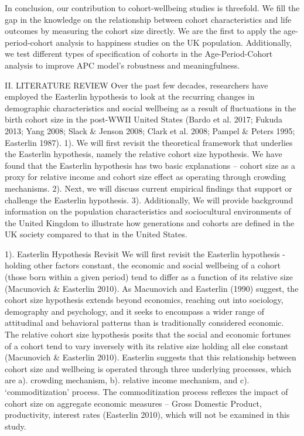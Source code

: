 In conclusion, our contribution to cohort-wellbeing studies is threefold. We fill the gap in the knowledge on the relationship between cohort characteristics and life outcomes by measuring the cohort size directly. We are the first to apply the age-period-cohort analysis to happiness studies on the UK population. Additionally, we test different types of specification of cohorts in the Age-Period-Cohort analysis to improve APC model’s robustness and meaningfulness.

II. LITERATURE REVIEW
Over the past few decades, researchers have employed the Easterlin hypothesis to look at the recurring changes in demographic characteristics and social wellbeing as a result of fluctuations in the birth cohort size in the post-WWII United States (Bardo et al. 2017; Fukuda 2013; Yang 2008; Slack & Jenson 2008; Clark et al. 2008; Pampel & Peters 1995; Easterlin 1987). 1). We will first revisit the theoretical framework that underlies the Easterlin hypothesis, namely the relative cohort size hypothesis. We have found that the Easterlin hypothesis has two basic explanations – cohort size as a proxy for relative income and cohort size effect as operating through crowding mechanisms. 2). Next, we will discuss current empirical findings that support or challenge the Easterlin hypothesis. 3). Additionally, We will provide background information on the population characteristics and sociocultural environments of the United Kingdom to illustrate how generations and cohorts are defined in the UK society compared to that in the United States.

1). Easterlin Hypothesis Revisit
We will first revisit the Easterlin hypothesis - holding other factors constant, the economic and social wellbeing of a cohort (those born within a given period) tend to differ as a function of its relative size (Macunovich & Easterlin 2010). As Macunovich and Easterlin (1990) suggest, the cohort size hypothesis extends beyond economics, reaching out into sociology, demography and psychology, and it seeks to encompass a wider range of attitudinal and behavioral patterns than is traditionally considered economic. The relative cohort size hypothesis posits that the social and economic fortunes of a cohort tend to vary inversely with its relative size holding all else constant (Macunovich & Easterlin 2010). Easterlin suggests that this relationship between cohort size and wellbeing is operated through three underlying processes, which are a). crowding mechanism, b). relative income mechanism, and c). ‘commoditization’ process. The commoditization process reflexes the impact of cohort size on aggregate economic measures – Gross Domestic Product, productivity, interest rates (Easterlin 2010), which will not be examined in this study. 

